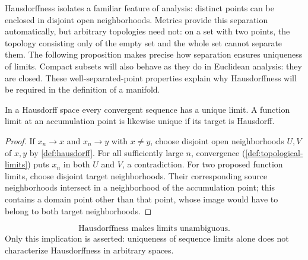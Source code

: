 Hausdorffness isolates a familiar feature of analysis: distinct points can
be enclosed in disjoint open neighborhoods. Metrics provide this separation
automatically, but arbitrary topologies need not: on a set with two points,
the topology consisting only of the empty set and the whole set cannot
separate them. The following proposition makes precise how separation
ensures uniqueness of limits.
Compact subsets will also behave as they do in Euclidean analysis: they
are closed. These well-separated-point properties explain why Hausdorffness
will be required in the definition of a manifold.

\begin{proposition}\label{prop:hausdorff-limits}
In a Hausdorff space every convergent sequence has a unique limit.
A function limit at an accumulation point is likewise unique if its
target is Hausdorff.
\end{proposition}
\begin{proof}
If $x_n\to x$ and $x_n\to y$ with $x\ne y$, choose disjoint open
neighborhoods $U,V$ of $x,y$ by \cref{def:hausdorff}. For all sufficiently
large $n$, convergence (\cref{def:topological-limits}) puts $x_n$ in
both $U$ and $V$, a contradiction. For two proposed function limits,
choose disjoint target neighborhoods. Their corresponding source
neighborhoods intersect in a neighborhood of the accumulation point;
this contains a domain point other than that point, whose image would
have to belong to both target neighborhoods.
\end{proof}
\[
\boxed{\text{Hausdorffness makes limits unambiguous.}}
\]
Only this implication is asserted: uniqueness of sequence limits alone
does not characterize Hausdorffness in arbitrary spaces.

